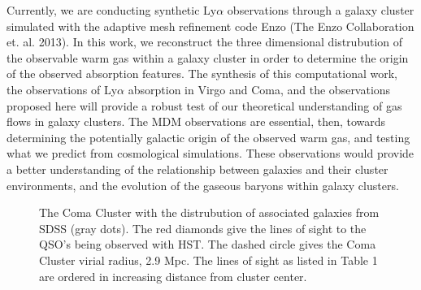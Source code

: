 Currently, we are conducting synthetic Ly$\alpha$ observations through a galaxy
cluster simulated with the adaptive mesh refinement code Enzo
(The Enzo Collaboration et. al. 2013).
In this work, we reconstruct the three dimensional distrubution of the
observable warm gas within a galaxy cluster in order to determine the origin
of the observed absorption features. The synthesis of this 
computational work, the observations of Ly$\alpha$ absorption in Virgo and Coma,
and the observations proposed here will provide a robust test of our theoretical
understanding of gas flows in galaxy clusters.
The MDM observations are essential, then, towards determining the potentially 
galactic origin of the observed warm gas, and testing what we predict from
cosmological simulations. These observations would provide a better understanding
of the relationship between galaxies and their cluster environments, and the 
evolution of the gaseous baryons within galaxy clusters. 

\begin{figure}
\label{fig:coma}
\caption{The Coma Cluster with the distrubution of associated galaxies from SDSS (gray dots).
The red diamonds give the lines of sight to the QSO's being observed with HST. The dashed
circle gives the Coma Cluster virial radius, 2.9 Mpc. The lines of sight as listed
in Table 1 are ordered in increasing distance from cluster center.}
\end{figure}





